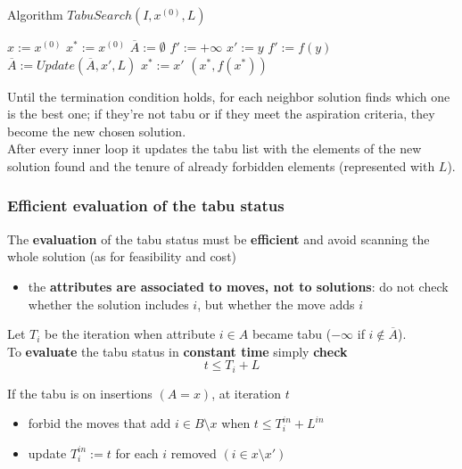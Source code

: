 \begin{algorithm}
	\caption{Algorithm $TabuSearch(I , x^{(0)}, L)$}
	\begin{algorithmic}
		\STATE $x := x^{(0)}$ 
		\STATE $x^\ast := x^{(0)}$
		\STATE $\overline{A} := \emptyset$
		\STATE $f' := + \infty$
		\STATE $x' := y$
		\STATE $f' := f (y )$
		\ENDIF
		\ENDIF
		\ENDFOR
		\STATE $\overline{A} := Update( \overline{A}, x', L)$
		\STATE $x^\ast := x'$
		\ENDIF
		\ENDWHILE
		\RETURN $(x^\ast, f (x^\ast))$
	\end{algorithmic}
\end{algorithm}

Until the termination condition holds, for each neighbor solution finds which one is the best one; if they're not tabu or if they meet the aspiration criteria, they become the new chosen solution.\\
After every inner loop it updates the tabu list with the elements of the new solution found and the tenure of already forbidden elements (represented with $L$).\\

\newpage

\subsubsection{Efficient evaluation of the tabu status}

The \textbf{evaluation} of the tabu status must be \textbf{efficient} and avoid scanning the whole solution (as for feasibility and cost)
\begin{itemize}
	\item the \textbf{attributes are associated to moves, not to solutions}: do not check whether the solution includes $i$, but whether the move adds $i$
\end{itemize}

Let $T_i$ be the iteration when attribute $i \in A$ became tabu ($-\infty$ if $i \notin \overline{A}$).\\

To \textbf{evaluate} the tabu status in \textbf{constant time} simply \textbf{check}
$$ t \leq T_i + L $$

If the tabu is on insertions $(A = x)$, at iteration $t$
\begin{itemize}
	\item forbid the moves that add $i \in B \setminus x$ when $t \leq T_i^{in} + L^{in}$
	
	\item update $T_i^{in} := t$ for each $i$ removed $(i \in x \setminus x')$
\end{itemize}

